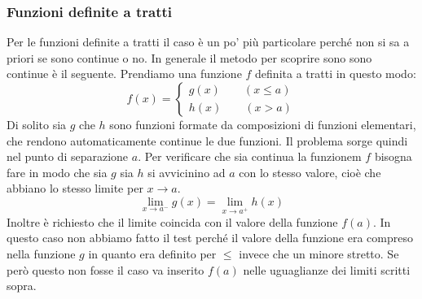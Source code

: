\subsubsection{Funzioni definite a tratti}
Per le funzioni definite a tratti il caso è un po' più particolare perché non si sa a priori se sono continue o no. In generale il metodo per scoprire sono sono continue è il seguente. Prendiamo una funzione $f$ definita a tratti in questo modo:
\begin{equation*}
    f(x) =
    \begin{cases*}
        g(x) \qquad (x \leq a)\\
        h(x) \qquad (x > a)
    \end{cases*}
\end{equation*}
Di solito sia $g$ che $h$ sono funzioni formate da composizioni di funzioni elementari, che rendono automaticamente continue le due funzioni. Il problema sorge quindi nel punto di separazione $a$. Per verificare che sia continua la funzionem $f$ bisogna fare in modo che sia $g$ sia $h$ si avvicinino ad $a$ con lo stesso valore, cioè che abbiano lo stesso limite per $x \to a$.
\begin{equation*}
    \lim_{x \to a^-} g(x) = \lim_{x \to a^+} h(x)
\end{equation*}
Inoltre è richiesto che il limite coincida con il valore della funzione $f(a)$. In questo caso non abbiamo fatto il test perché il valore della funzione era compreso nella funzione $g$ in quanto era definito per $\leq$ invece che un minore stretto. Se però questo non fosse il caso va inserito $f(a)$ nelle uguaglianze dei limiti scritti sopra.
